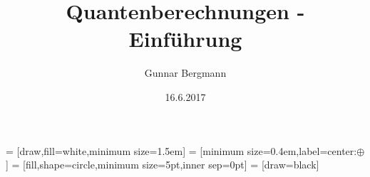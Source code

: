 \usepackage{tikz} 
\usetikzlibrary{backgrounds,fit,decorations.pathreplacing, positioning, calc}

\newcommand{\qreg}[1]{\ensuremath{\left|#1\right\rangle}}
\newcommand{\qregfun}[2]{\qreg{#1} \rightarrow \qreg{#2}}
\newcommand{\qregv}[2]{#1_{#2} |#2\rangle}
\newcommand{\qregPlus}{\frac{\qreg 0 + \qreg 1}{\sqrt 2}}
\newcommand{\qregMinus}{\frac{\qreg 0 - \qreg 1}{\sqrt 2}}
\newcommand{\qbitH}[1]{\left[\frac{\qreg 0 #1 \qreg 1}{\sqrt 2}\right]}



 = [draw,fill=white,minimum size=1.5em] 
 = [minimum size=0.4em,label=center:$\oplus$]  %
 = [fill,shape=circle,minimum size=5pt,inner sep=0pt]
 = [draw=black]
\DeclareMathOperator{\NOT}{NOT}
\DeclareMathOperator{\CNOT}{CNOT}

\DeclareMathOperator{\cP}{P}
\DeclareMathOperator{\cNP}{NP}
\DeclareMathOperator{\cPSPACE}{PSPACE}
\DeclareMathOperator{\cL}{L}
\DeclareMathOperator{\cBQP}{BQP}
\DeclareMathOperator{\cBPP}{BPP}

\title{Quantenberechnungen - Einführung}
\author{Gunnar Bergmann}
\date{16.6.2017}

\newcommand{\pictureDeutschAlgo}{
    \begin{tikzpicture}
        \node[left] at (0,0) (q1) {\qreg 0};
        \node[left] at (0,-1) (q2) { \qreg 1 };
        \node[operator, right=of q1] (h11) {$H$} edge [-] (q1);
        \node[operator, right=of q2] (h12) {$H$} edge [-] (q2);

        \node[right, right=of h11] (uf11)  {$x$}     edge [-] (h11);
        \node[right, right=of h12] (uf12)  {$y$}    edge [-] (h12);
        \node[right=5em of uf11, left] (uf21)  {$x$};
        \node[right=5em of uf12, left] (uf22)   {$y \oplus f(x)$};

        \node (text) at ($(uf22)!0.5!(uf11)$) {$U_f$};

        \node[operator, right=of uf12] (h21) at (5,0) {$H$} edge [-] (uf21);
        \node[right] (out1) at (8,0) {} edge [-] (h21);
        \node[right] (out2) at (8,-1) {} edge [-] (uf22);

        \begin{pgfonlayer}{background} 
        \node[surround] (background) [fit = (uf11) (uf12) (uf21)] {};
        \end{pgfonlayer}
    \end{tikzpicture}
    }

